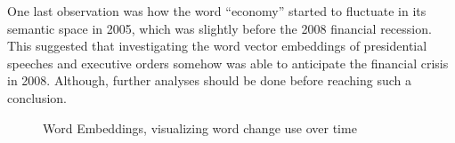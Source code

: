 \documentclass{article}
\begin{document}
{{One last observation was how the word “economy” started to fluctuate in its semantic space in 2005, which was slightly before the 2008 financial recession. This suggested that investigating the word vector embeddings of presidential speeches and executive orders somehow was able to anticipate the financial crisis in 2008. Although, further analyses should be done before reaching such a conclusion.
}
\begin{figure}[H]
	\caption{\label{fig:my-label7} Word Embeddings, visualizing word change use over time}
\end{figure}
}
\end{document}
